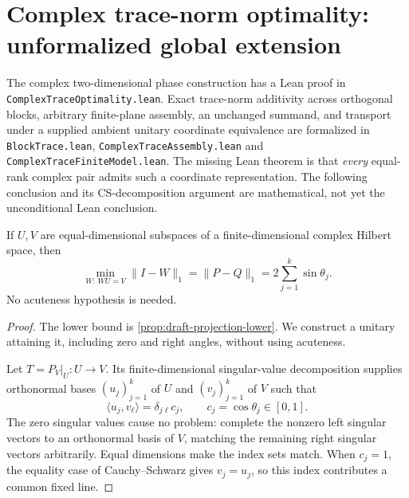 \section{Complex trace-norm optimality: unformalized global extension}
\label{sec:unformalized-sharp-displacement}

\begin{tcolorbox}[
  enhanced, breakable, colback=white, colframe=red!80!black,
  colbacktitle=red!6!white, coltitle=red!80!black,
  title={WORKING EXTENSION --- unconditional complex optimum not yet Lean-verified},
  fonttitle=\bfseries, boxrule=1.05pt,
  left=9pt, right=9pt, top=9pt, bottom=9pt,
  before skip=12pt, after skip=12pt]

The complex two-dimensional phase construction has a Lean proof in
\texttt{ComplexTraceOptimality.lean}. Exact trace-norm additivity across
orthogonal blocks, arbitrary finite-plane assembly, an unchanged summand,
and transport under a supplied ambient unitary coordinate equivalence
are formalized in \texttt{BlockTrace.lean},
\texttt{ComplexTraceAssembly.lean} and
\texttt{ComplexTraceFiniteModel.lean}. The missing Lean theorem is that
\emph{every} equal-rank complex pair admits such a coordinate
representation. The following conclusion and its CS-decomposition argument
are mathematical, not yet the unconditional Lean conclusion.

\begin{proposition}
\label{prop:draft-complex-trace-optimum}
If $U,V$ are equal-dimensional subspaces of a finite-dimensional complex
Hilbert space, then
\begin{equation}
  \min_{W:\,WU=V}\|I-W\|_1
  =\|P-Q\|_1
  =2\sum_{j=1}^k\sin\theta_j.
  \label{eq:draft-complex-trace-optimum}
\end{equation}
No acuteness hypothesis is needed.
\end{proposition}

\begin{proof}
The lower bound is \cref{prop:draft-projection-lower}. We construct a unitary
attaining it, including zero and right angles, without using acuteness.

Let $T=P_V|_U:U\to V$. Its finite-dimensional singular-value
decomposition supplies orthonormal bases $(u_j)_{j=1}^k$ of $U$ and
$(v_j)_{j=1}^k$ of $V$ such that
\[
 \langle u_j,v_\ell\rangle=\delta_{j\ell}c_j,
 \qquad c_j=\cos\theta_j\in[0,1].
\]
The zero singular values cause no problem: complete the nonzero left
singular vectors to an orthonormal basis of $V$, matching the remaining
right singular vectors arbitrarily. Equal dimensions make the index sets
match. When $c_j=1$, the equality case of Cauchy--Schwarz gives
$v_j=u_j$, so this index contributes a common fixed line.


\end{proof}
\end{tcolorbox}
